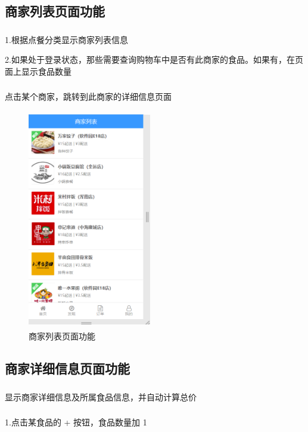 \subsection{商家列表页面功能}
\subsubsection*{}
1.根据点餐分类显示商家列表信息

2.如果处于登录状态，那些需要查询购物车中是否有此商家的食品。如果有，在页面上显示食品数量
\subsubsection*{}
点击某个商家，跳转到此商家的详细信息页面
\begin{figure}[H]
    \centering
    \includegraphics[width=5.4cm,height=9.6cm]{figures/3.1.2.png}
    \caption{商家列表页面功能}
\end{figure}

\subsection{商家详细信息页面功能}
\subsubsection*{}
显示商家详细信息及所属食品信息，并自动计算总价
\subsubsection*{}
1.点击某食品的 + 按钮，食品数量加 1

